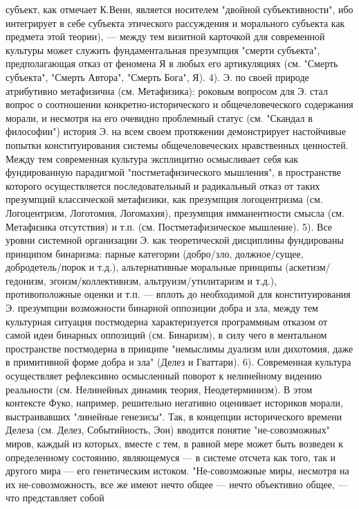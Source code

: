 \documentclass[12pt]{article}
\begin{document}
субъект, как отмечает К.Венн, является носителем "двойной субъективности", ибо интегрирует в себе субъекта
этического рассуждения и морального субъекта как предмета этой теории), — между тем визитной карточкой
для современной культуры может служить фундаментальная презумпция "смерти субъекта", предполагающая
отказ от феномена Я в любых его артикуляциях (см. "Смерть субъекта", "Смерть Автора", "Смерть Бога", Я). 4).
Э. по своей природе атрибутивно метафизична (см. Метафизика): роковым вопросом для Э. стал вопрос о
соотношении конкретно-исторического и общечеловеческого содержания морали, и несмотря на его очевидно
проблемный  статус  (см.  "Скандал  в  философии")  история  Э.  на  всем  своем  протяжении  демонстрирует
настойчивые  попытки  конституирования  системы  общечеловеческих  нравственных  ценностей.  Между  тем
современная культура эксплицитно осмысливает себя как фундированную парадигмой "постметафизического
мышления",  в  пространстве  которого  осуществляется  последовательный  и  радикальный  отказ  от  таких
презумпций  классической  метафизики,  как  презумпция  логоцентризма  (см.  Логоцентризм,  Логотомия,
Логомахия), презумпция имманентности смысла (см. Метафизика отсутствия) и т.п. (см. Постметафизическое
мышление). 5). Все уровни системной организации Э. как теоретической дисциплины фундированы принципом
бинаризма: парные категории (добро/зло, должное/сущее, добродетель/порок и т.д.), альтернативные моральные
принципы (аскетизм/гедонизм, эгоизм/коллективизм, альтруизм/утилитаризм и т.д.), противоположные оценки и
т.п. — вплоть до необходимой для конституирования Э. презумпции возможности бинарной оппозиции добра и
зла,  между  тем  культурная  ситуация  постмодерна  характеризуется  программным  отказом  от  самой  идеи
бинарных  оппозиций  (см.  Бинаризм),  в  силу  чего  в  ментальном  пространстве  постмодерна  в  принципе
"немыслимы  дуализм  или  дихотомия,  даже  в  примитивной  форме  добра  и  зла"  (Делез  и  Гваттари).  6).
Современная культура осуществляет рефлексивно осмысленный поворот к нелинейному видению реальности
(см. Нелинейных динамик теория, Неодетерминизм). В этом контексте Фуко, например, решительно негативно
оценивает историков морали, выстраивавших "линейные генезисы". Так, в концепции исторического времени
Делеза (см. Делез, Событийность, Эон) вводится понятие "не-совозможных" миров, каждый из которых, вместе
с тем, в равной мере может быть возведен к определенному состоянию, являющемуся — в системе отсчета как
того,  так  и  другого  мира  —  его  генетическим  истоком.  "Не-совозможные  миры,  несмотря  на  их  не-совозможность,  все  же  имеют  нечто  общее  —  нечто  объективно  общее,  —  что  представляет  собой
\end{document}
